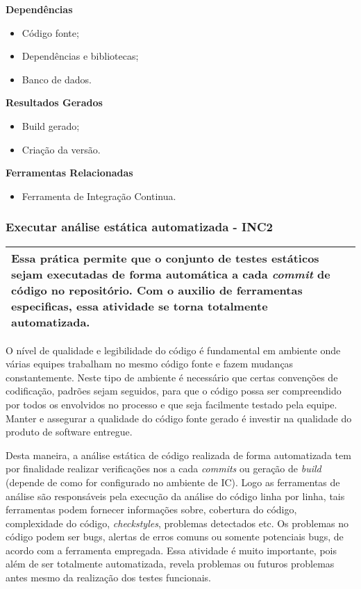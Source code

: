 \textbf{Dependências}
\begin{itemize}
    \item Código fonte;
    \item Dependências e bibliotecas;
    \item Banco de dados.
\end{itemize}

\textbf{ Resultados Gerados }
\begin{itemize}
    \item Build gerado;
    \item Criação da versão.
\end{itemize}

\textbf{ Ferramentas Relacionadas }
\begin{itemize}
    \item Ferramenta de Integração Continua.
\end{itemize}

\subsubsection{Executar análise estática automatizada - INC2}
\label{sec:inc2}

\begin{table}[!ht]
\centering
\begin{tabular}{|p{130mm}|}
\hline
Essa prática permite que o conjunto de testes estáticos sejam executadas de forma automática a cada \textit{commit} de código no repositório. Com o auxilio de ferramentas especificas, essa atividade se torna totalmente automatizada. \\ 
\hline
\end{tabular}
\end{table}

O nível de qualidade e legibilidade do código é fundamental em ambiente onde várias equipes trabalham no mesmo código fonte e fazem mudanças constantemente. Neste tipo de ambiente é necessário que certas convenções de codificação, padrões sejam seguidos, para que o código possa ser compreendido por todos os envolvidos no processo e que seja facilmente testado pela equipe. Manter e assegurar a qualidade do código fonte gerado é investir na qualidade do produto de software entregue.

Desta maneira, a análise estática de código realizada de forma automatizada tem por finalidade realizar verificações nos a cada \textit{commits} ou geração de \textit{build} (depende de como for configurado no ambiente de IC). Logo as ferramentas de análise são responsáveis pela execução da análise do código linha por linha, tais ferramentas podem fornecer informações sobre, cobertura do código, complexidade do código, \textit{checkstyles}, problemas detectados etc. Os problemas no código podem ser bugs, alertas de erros comuns ou somente potenciais bugs, de acordo com a ferramenta empregada. Essa atividade é muito importante, pois além de ser totalmente automatizada, revela problemas ou futuros problemas antes mesmo da realização dos testes funcionais.

